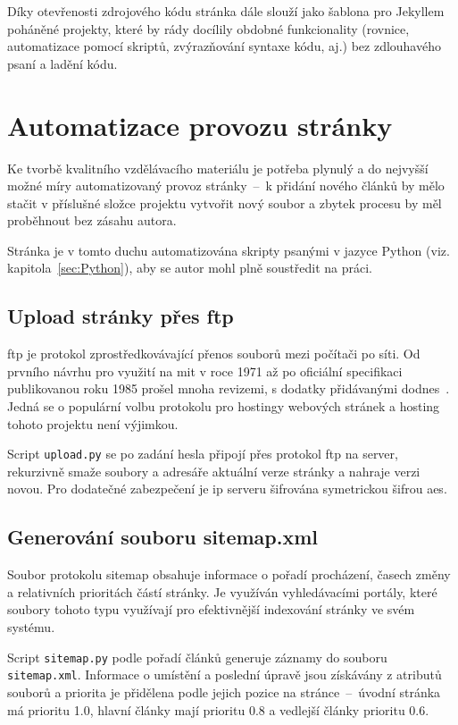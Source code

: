 \documentclass[a4paper, 12pt, twoside]{article}
\begin{document}
  Díky otevřenosti zdrojového kódu stránka dále slouží jako šablona pro Jekyllem poháněné projekty, které by rády docílily obdobné funkcionality (rovnice, automatizace pomocí skriptů, zvýrazňování syntaxe kódu, aj.) bez zdlouhavého psaní a ladění kódu.


  \section{Automatizace provozu stránky} \label{sec:Automatizace provozu stránky}
  Ke tvorbě kvalitního vzdělávacího materiálu je potřeba plynulý a do nejvyšší možné míry automatizovaný provoz stránky~--~k přidání nového článků by mělo stačit v příslušné složce projektu vytvořit nový soubor a zbytek procesu by měl proběhnout bez zásahu autora.

  Stránka je v tomto duchu automatizována skripty psanými v jazyce Python (viz. kapitola~\ref{sec:Python}), aby se autor mohl plně soustředit na práci.


  \subsection{Upload stránky přes \acrshort{ftp}}
  \gls{ftp} je protokol zprostředkovávající přenos souborů mezi počítači po síti. Od prvního návrhu pro využití na \gls{mit} v roce 1971 až po oficiální specifikaci publikovanou roku 1985 prošel mnoha revizemi, s dodatky přidávanými dodnes~\cite{ftp-specification}. Jedná se o populární volbu protokolu pro hostingy webových stránek a hosting tohoto projektu není výjimkou.

  Script \texttt{upload.py} se po zadání hesla připojí přes protokol \gls{ftp} na server, rekurzivně smaže soubory a adresáře aktuální verze stránky a nahraje verzi novou. Pro dodatečné zabezpečení je \gls{ip} serveru šifrována symetrickou šifrou \gls{aes}.


  \subsection{Generování souboru sitemap.xml}
  Soubor protokolu sitemap obsahuje informace o pořadí procházení, časech změny a relativních prioritách částí stránky. Je využíván vyhledávacími portály, které soubory tohoto typu využívají pro efektivnější indexování stránky ve svém systému.

  Script \texttt{sitemap.py} podle pořadí článků generuje záznamy do souboru \texttt{sitemap.xml}. Informace o umístění a poslední úpravě jsou získávány z atributů souborů a priorita je přidělena podle jejich pozice na stránce~--~úvodní stránka má prioritu \num{1.0}, hlavní články mají prioritu \num{0.8} a vedlejší články prioritu \num{0.6}.
\end{document}
